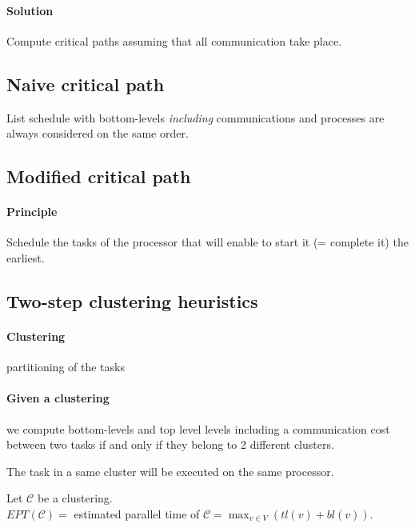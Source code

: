 \paragraph{Solution}
Compute critical paths assuming that all communication take place.

\subsection{Naive critical path}
List schedule with bottom-levels \emph{including} communications and processes are always considered on the same order.


\subsection{Modified critical path}
\paragraph{Principle}
Schedule the tasks of the processor that will enable to start it (= complete it) the earliest.


\subsection{Two-step clustering heuristics}
\paragraph{Clustering}
partitioning of the tasks

\paragraph{Given a clustering}
we compute bottom-levels and top level levels including a communication cost between two tasks if and only if they belong to 2 different clusters.

The task in a same cluster will be executed on the same processor.

Let $\mathcal{C}$ be a clustering.\\
$EPT(\mathcal{C})=$ estimated parallel time of $\mathcal{C}=\max_{v\in V} (tl(v) + bl(v))$.

